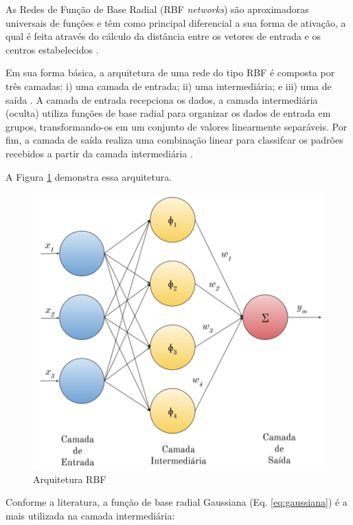 \documentclass[qual, classic, a4paper]{ufbathesis}
\begin{document}
As Redes de Função de Base Radial (RBF \textit{networks}) são aproximadoras universais de funções e têm como principal diferencial a sua forma de ativação, a qual é feita através do cálculo da distância entre os vetores de entrada e os centros estabelecidos \cite{Braga:RedesNeuraisTeoriaAplicacoes}.

Em sua forma básica, a arquitetura de uma rede do tipo RBF é composta por três camadas: 
i) uma camada de entrada; ii) uma intermediária; e iii) uma de saída \cite{Rojas:1996:NNS:235222}. 
A camada de entrada recepciona os dados, a camada intermediária (oculta) utiliza funções de base radial para organizar os dados de entrada em grupos, transformando-os em um conjunto de valores linearmente separáveis. Por fim, a camada de saída realiza uma combinação linear para classifcar os padrões recebidos a partir da camada intermediária \cite{Braga:RedesNeuraisTeoriaAplicacoes}. 

A Figura \ref{fig:rbg_arq} demonstra essa arquitetura.

\begin{figure}[H]
\begin{center}
    \includegraphics[scale=1]{imagens/rbf_arq.png}
    \caption{Arquitetura RBF}
    \label{fig:rbg_arq}
\end{center}
\end{figure}

Conforme a literatura, a função de base radial Gaussiana (Eq. \ref{eq:gaussiana}) é a mais utilizada na camada intermediária:
\end{document}
